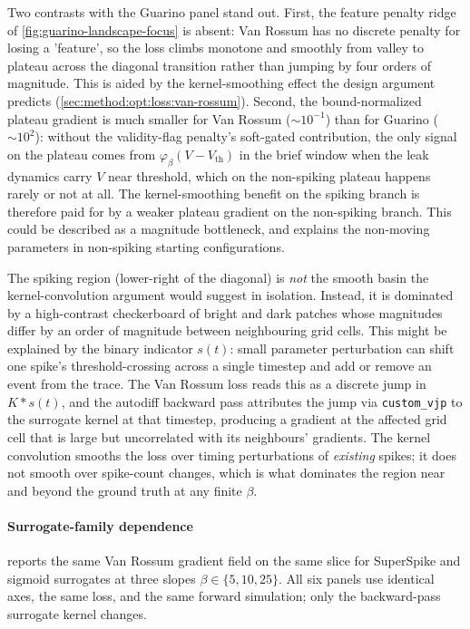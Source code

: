 Two contrasts with the Guarino panel stand out.
First, the feature penalty ridge of \cref{fig:guarino-landscape-focus} is absent:
Van Rossum has no discrete penalty for losing a 'feature', so the loss climbs monotone and smoothly from valley to plateau across the diagonal transition rather than jumping by four orders of magnitude.
This is aided by the kernel-smoothing effect the design argument predicts (\cref{sec:method:opt:loss:van-rossum}).
Second, the bound-normalized plateau gradient is much smaller for Van Rossum ($\sim 10^{-1}$) than for Guarino ($\sim 10^{2}$):
without the validity-flag penalty's soft-gated contribution, the only signal on the plateau comes from $\varphi_\beta(V - V_{\mathrm{th}})$ in the brief window when the leak dynamics carry $V$ near threshold, which on the non-spiking plateau happens rarely or not at all.
The kernel-smoothing benefit on the spiking branch is therefore paid for by a weaker plateau gradient on the non-spiking branch.
This could be described as a magnitude bottleneck, and explains the non-moving parameters in non-spiking starting configurations.

The spiking region (lower-right of the diagonal) is \emph{not} the smooth basin the kernel-convolution argument would suggest in isolation.
Instead, it is dominated by a high-contrast checkerboard of bright and dark patches whose magnitudes differ by an order of magnitude between neighbouring grid cells.
This might be explained by the binary indicator $s(t)$: small parameter perturbation can shift one spike's threshold-crossing across a single timestep and add or remove an event from the trace.
The Van Rossum loss reads this as a discrete jump in $K \ast s(t)$, and the autodiff backward pass attributes the jump via \texttt{custom\_vjp} to the surrogate kernel at that timestep, producing a gradient at the affected grid cell that is large but uncorrelated with its neighbours' gradients.
The kernel convolution smooths the loss over timing perturbations of \emph{existing} spikes;
it does not smooth over spike-count changes, which is what dominates the region near and beyond the ground truth at any finite $\beta$.

\paragraph*{Surrogate-family dependence}

 reports the same Van Rossum gradient field on the same slice for SuperSpike and sigmoid surrogates at three slopes $\beta\in\{5,10,25\}$.
All six panels use identical axes, the same loss, and the same forward simulation; only the backward-pass surrogate kernel changes.


